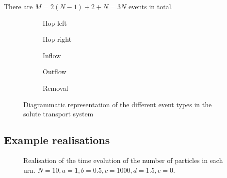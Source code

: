 There are \(M=2(N-1) + 2 + N = 3N\) events in total.

\begin{figure}[ht!]
    \centering
    \begin{subfigure}[b]{0.3\textwidth}
        \centering
        {
        }
        \caption{Hop left}
    \end{subfigure}
    \qquad\qquad
    \begin{subfigure}[b]{0.3\textwidth}
        \centering
        {
        }
        \caption{Hop right}
    \end{subfigure}

    \begin{subfigure}[b]{0.3\textwidth}
        \centering
        {
        }
        \caption{Inflow}
    \end{subfigure}
    \qquad\qquad
    \begin{subfigure}[b]{0.3\textwidth}
        \centering
        {
        }
        \caption{Outflow}
    \end{subfigure}

    \begin{subfigure}[b]{0.3\textwidth}
        \centering
        {
        }
        \caption{Removal}
    \end{subfigure}
    \caption{\label{fig:transport_events}Diagrammatic representation of the
different event types in the solute transport system}
\end{figure}

\FloatBarrier

\subsection{Example realisations}

\begin{figure}[ht!]
    \centering
    {
    }

    \caption{\label{fig:exreal1}Realisation of the time evolution of the number
of particles in each urn. \(N=10,a=1,b=0.5,c=1000,d=1.5,e=0\).}
\end{figure}

